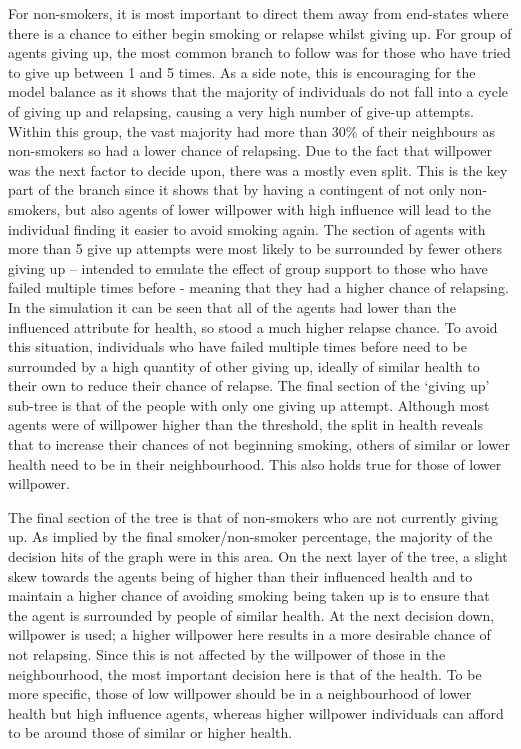 \documentclass[]{report}
\begin{document}
For non-smokers, it is most important to direct them away from end-states where there is a chance to either begin smoking or relapse whilst giving up. For group of agents giving up, the most common branch to follow was for those who have tried to give up between 1 and 5 times. As a side note, this is encouraging for the model balance as it shows that the majority of individuals do not fall into a cycle of giving up and relapsing, causing a very high number of give-up attempts. Within this group, the vast majority had more than 30\% of their neighbours as non-smokers so had a lower chance of relapsing. Due to the fact that willpower was the next factor to decide upon, there was a mostly even split. This is the key part of the branch since it shows that by having a contingent of not only non-smokers, but also agents of lower willpower with high influence will lead to the individual finding it easier to avoid smoking again. The section of agents with more than 5 give up attempts were most likely to be surrounded by fewer others giving up – intended to emulate the effect of group support to those who have failed multiple times before - meaning that they had a higher chance of relapsing. In the simulation it can be seen that all of the agents had lower than the influenced attribute for health, so stood a much higher relapse chance. To avoid this situation, individuals who have failed multiple times before need to be surrounded by a high quantity of other giving up, ideally of similar health to their own to reduce their chance of relapse. The final section of the `giving up' sub-tree is that of the people with only one giving up attempt. Although most agents were of willpower higher than the threshold, the split in health reveals that to increase their chances of not beginning smoking, others of similar or lower health need to be in their neighbourhood. This also holds true for those of lower willpower.

The final section of the tree is that of non-smokers who are not currently giving up. As implied by the final smoker/non-smoker percentage, the majority of the decision hits of the graph were in this area. On the next layer of the tree, a slight skew towards the agents being of higher than their influenced health and to maintain a higher chance of avoiding smoking being taken up is to ensure that the agent is surrounded by people of similar health. At the next decision down, willpower is used; a higher willpower here results in a more desirable chance of not relapsing. Since this is not affected by the willpower of those in the neighbourhood, the most important decision here is that of the health. To be more specific, those of low willpower should be in a neighbourhood of lower health but high influence agents, whereas higher willpower individuals can afford to be around those of similar or higher health.
\end{document}
